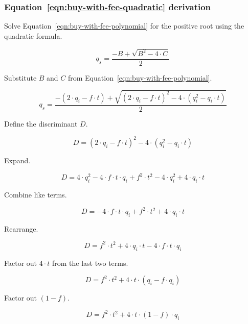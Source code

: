 \subsubsection{Equation~\ref{eqn:buy-with-fee-quadratic} derivation}%
\label{sssec:equation-eqn-buy-with-fee-quadratic-derivation}

Solve Equation~\ref{eqn:buy-with-fee-polynomial} for the positive root using the
quadratic formula.

\begin{equation*}
	q_s = \frac{-B + \sqrt{B^2 - 4 \cdot C}}{2}
\end{equation*}

Substitute $B$ and $C$ from Equation~\ref{eqn:buy-with-fee-polynomial}.

\begin{equation*}
	q_s = \frac{-(2 \cdot q_i - f \cdot t) +
		\sqrt{{(2 \cdot q_i - f \cdot t)}^2 - 4 \cdot (q_i^2 - q_i \cdot t)}}{2}
\end{equation*}

Define the discriminant $D$.

\begin{equation*}
	D = {(2 \cdot q_i - f \cdot t)}^2 - 4 \cdot (q_i^2 - q_i \cdot t)
\end{equation*}

Expand.

\begin{equation*}
	D = 4 \cdot q_i^2 - 4 \cdot f \cdot t \cdot q_i + f^2 \cdot t^2
	- 4 \cdot q_i^2 + 4 \cdot q_i \cdot t
\end{equation*}

Combine like terms.

\begin{equation*}
	D = -4 \cdot f \cdot t \cdot q_i + f^2 \cdot t^2 + 4 \cdot q_i \cdot t
\end{equation*}

Rearrange.

\begin{equation*}
	D = f^2 \cdot t^2 + 4 \cdot q_i \cdot t - 4 \cdot f \cdot t \cdot q_i
\end{equation*}

Factor out $4 \cdot t$ from the last two terms.

\begin{equation*}
	D = f^2 \cdot t^2 + 4 \cdot t \cdot (q_i - f \cdot q_i)
\end{equation*}

Factor out $(1 - f)$.

\begin{equation*}
	D = f^2 \cdot t^2 + 4 \cdot t \cdot (1 - f) \cdot q_i
\end{equation*}

